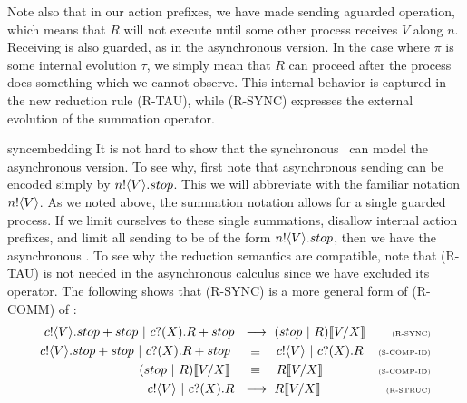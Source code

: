 Note also that in our action prefixes, we have made sending aguarded operation, which means that $R$ will not execute until some other process receives $V$ along $n$.   Receiving is also guarded, as in the asynchronous version.  In the case where $\pi$ is some internal evolution $\tau$, we simply mean that $R$ can proceed after the process does something which we cannot observe.  This internal behavior is captured in the new reduction rule (R-TAU), while (R-SYNC) expresses the external evolution of the summation operator.

\begin{example}{syncembedding}
	It is not hard to show that the synchronous \picalc\ can model the asynchronous version.  To see why, first note that asynchronous sending can be encoded simply by ${n}!\langle{V}\rangle.stop$.  This we will abbreviate with the familiar notation ${n}!\langle{V}\rangle$.  As we noted above, the summation notation allows for a single guarded process.  If we limit ourselves to these single summations, disallow internal action prefixes, and limit all sending to be of the form ${n}!\langle{V}\rangle.stop$, then we have the asynchronous \picalc.  To see why the reduction semantics are compatible, note that (R-TAU) is not needed in the asynchronous calculus since we have excluded its operator.  The following shows that (R-SYNC) is a more general form of (R-COMM) of :
	\begin{align*}
		\ssend{c}{V} stop + stop \comp \receive{c}{X}R + stop\ &\  \pred\  (stop \comp R)\subst{V}{X} & \text{\tiny{(R-SYNC)}}\\
		\ssend{c}{V} stop + stop \comp \receive{c}{X}R + stop\ \ &\ \ \sequiv\ \ \  \send{c}{V} \comp \receive{c}{X}R & \text{\tiny{(S-COMP-ID)}}\\
		(stop \comp R)\subst{V}{X}\ \ &\ \ \sequiv\ \ \ R\subst{V}{X} & \text{\tiny{(S-COMP-ID)}}\\
		\send{c}{V} \comp \receive{c}{X}R\ &\  \pred\  R \subst{V}{X} & \text{\tiny{(R-STRUC)}}\\
	\end{align*}
\end{example}

